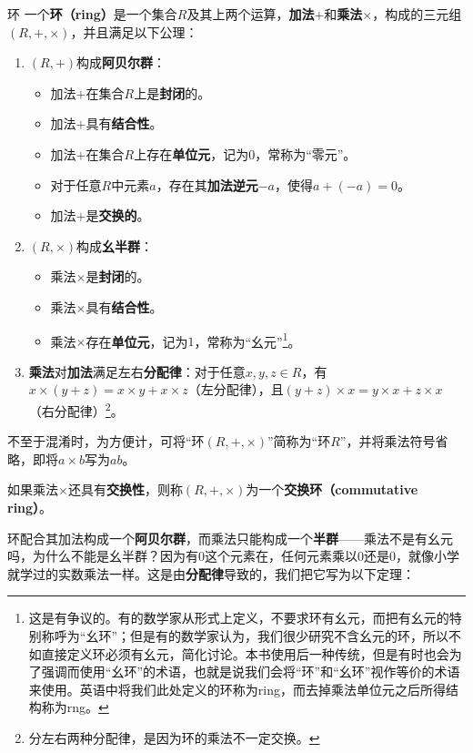 \begin{definition}{环}
一个\textbf{环（ring）}是一个集合$R$及其上两个运算，\textbf{加法}$+$和\textbf{乘法}$\times$，构成的三元组$(R, +, \times)$，并且满足以下公理：
\begin{enumerate}
    \item $(R, +)$构成\textbf{阿贝尔群}：
    \begin{itemize}
    \item 加法$+$在集合$R$上是\textbf{封闭}的。
    \item 加法$+$具有\textbf{结合性}。
    \item 加法$+$在集合$R$上存在\textbf{单位元}，记为$0$，常称为“零元”。
    \item 对于任意$R$中元素$a$，存在其\textbf{加法逆元}$-a$，使得$a+(-a)=0$。
    \item 加法$+$是\textbf{交换的}。
    \end{itemize}
    \item $(R, \times)$构成\textbf{幺半群}：
    \begin{itemize}
    \item 乘法$\times$是\textbf{封闭}的。
    \item 乘法$\times$具有\textbf{结合性}。
    \item 乘法$\times$存在\textbf{单位元}，记为$1$，常称为“幺元”\footnote{这是有争议的。有的数学家从形式上定义，不要求环有幺元，而把有幺元的特别称呼为“幺环”；但是有的数学家认为，我们很少研究不含幺元的环，所以不如直接定义环必须有幺元，简化讨论。本书使用后一种传统，但是有时也会为了强调而使用“幺环”的术语，也就是说我们会将“环”和“幺环”视作等价的术语来使用。英语中将我们此处定义的环称为ring，而去掉乘法单位元之后所得结构称为rng。}。
    \end{itemize}
    \item \textbf{乘法}对\textbf{加法}满足左右\textbf{分配律}：对于任意$x, y, z\in R$，有$x\times(y+z)=x\times y+x\times z$（左分配律），且$(y+z)\times x=y\times x+z\times x$（右分配律）\footnote{分左右两种分配律，是因为环的乘法不一定交换。}。
\end{enumerate}

不至于混淆时，为方便计，可将“环$(R, +, \times)$”简称为“环$R$”，并将乘法符号省略，即将$a\times b$写为$ab$。

如果乘法$\times$还具有\textbf{交换性}，则称$(R, +, \times)$为一个\textbf{交换环（commutative ring）}。
\end{definition}


环配合其加法构成一个\textbf{阿贝尔群}，而乘法只能构成一个\textbf{半群}——乘法不是有幺元吗，为什么不能是幺半群？因为有$0$这个元素在，任何元素乘以$0$还是$0$，就像小学就学过的实数乘法一样。这是由\textbf{分配律}导致的，我们把它写为以下定理：



